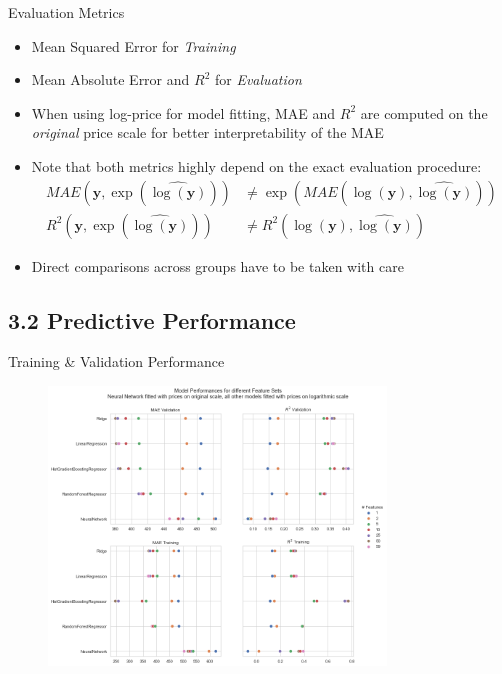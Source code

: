 \documentclass[ngerman,inputenc]{beamer}
\begin{document}
\begin{frame}{Evaluation Metrics}
  \begin{itemize}
    \item Mean Squared Error for \emph{Training} \pause
    \item Mean Absolute Error and $R^2$ for \emph{Evaluation} \pause
    \item When using log-price for model fitting, MAE and $R^2$ are computed on the \emph{original} price scale for better interpretability of the MAE \pause
    \item Note that both metrics highly depend on the exact evaluation procedure:
          \begin{align*}
            MAE \left(\mathbf{y}, \exp \left(\widehat{\log(\mathbf{y})}\right)\right)
             & \neq \exp \left(MAE \left(\log(\mathbf{y}), \widehat{\log(\mathbf{y})}\right) \right) \\
            R^2 \left(\mathbf{y}, \exp \left(\widehat{\log(\mathbf{y})}\right)\right)
             & \neq R^2 \left(\log(\mathbf{y}), \widehat{\log(\mathbf{y})}\right)
          \end{align*}
          \pause
    \item Direct comparisons across groups have to be taken with care
  \end{itemize}
\end{frame}

\subsection{3.2 Predictive Performance}

\begin{frame}{Training \& Validation Performance}
  \begin{figure}[h]
    \centering
    \includegraphics[width=0.8\textwidth]{model_comparison.png}
    \label{fig:model-comparison}
  \end{figure}
\end{frame}
\end{document}
